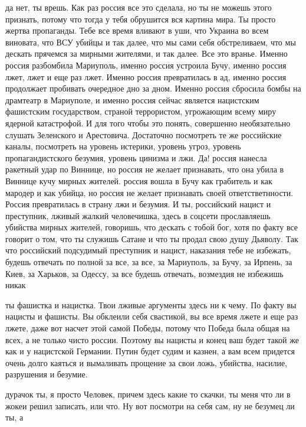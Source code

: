 да нет, ты врешь. Как раз россия все это сделала, но ты не можешь этого
признать, потому что тогда у тебя обрушится вся картина мира. Ты просто жертва
пропаганды. Тебе все время вливают в уши, что Украина во всем виновата, что ВСУ
убийцы и так далее, что мы сами себя обстреливаем, что мы дескать прячемся за
мирными жителями, и так далее. Все это вранье. Именно россия разбомбила
Мариуполь, именно россия устроила Бучу, именно россия лжет, лжет и еще раз
лжет. Именно россия превратилась в ад, именно россия продолжает пробивать
очередное дно за дном. Именно россия сбросила бомбы на драмтеатр в Мариуполе, и
именно россия сейчас является нацистским фашистским государством, страной
террористом, угрожающим всему миру ядерной катастрофой. И для того чтобы это
понять, совершенно необязательно слушать Зеленского и Арестовича. Достаточно
посмотреть те же российские каналы, посмотреть на уровень истерики, уровень
угроз, уровень пропагандистского безумия, уровень цинизма и лжи. Да! россия
нанесла ракетный удар по Виннице, но россия не желает признавать, что она убила
в Виннице кучу мирных жителей. россия вошла в Бучу как грабитель и как мародер
и как убийца, но россия не желает признавать своей ответстветнности. Россия
превратилась в страну лжи и безумия. И ты, российский нацист и преступник,
лживый жалкий человечишка, здесь в соцсети прославляешь убийства мирных
жителей, говоришь, что дескать с тобой бог, хотя по факту все говорит о том,
что ты служишь Сатане и что ты продал свою душу Дьяволу. Так что российский
подсудимый преступник и нацист, наказания тебе не избежать, будешь отвечать по
полной за все, за все, за Мариуполь, за Бучу, за Ирпень, за Киев, за Харьков,
за Одессу, за все будешь отвечать, возмездия не избежишь никак

ты фашистка и нацистка. Твои лживые аргументы здесь ни к чему. По факту вы
нацисты и фашисты. Вы обклеили себя свастикой, вы все время лжете и еще раз
лжете, даже вот насчет этой самой Победы, потому что Победа была общая на всех,
а не только чисто россии. Поэтому вы нацисты и конец ваш будет такой же как и у
нацистской Германии. Путин будет судим и казнен, а вам всем придется очень
долго каяться и вымаливать прощение за свои ложь, убийства, насилие, разрушения
и безумие.

дурачок ты, я просто Человек, причем здесь какие то скачки, ты меня что ли в
жокеи решил записать, или что. Ну вот посмотри на себя сам, ну не безумец ли
ты, а

